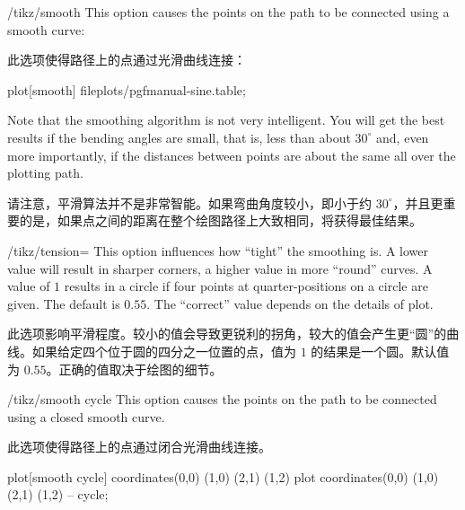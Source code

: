 \begin{key}{/tikz/smooth}
    This option causes the points on the path to be connected using a smooth
    curve:

    此选项使得路径上的点通过光滑曲线连接：

    \begin{codeexample}[]
\tikz\draw plot[smooth] file{plots/pgfmanual-sine.table};
\end{codeexample}

    Note that the smoothing algorithm is not very intelligent. You will get the
    best results if the bending angles are small, that is, less than about
    $30^\circ$ and, even more importantly, if the distances between points are
    about the same all over the plotting path.

    请注意，平滑算法并不是非常智能。如果弯曲角度较小，即小于约 $30^\circ$，并且更重要的是，如果点之间的距离在整个绘图路径上大致相同，将获得最佳结果。

\end{key}

\begin{key}{/tikz/tension=}
    This option influences how ``tight'' the smoothing is. A lower value will
    result in sharper corners, a higher value in more ``round'' curves. A value
    of $1$ results in a circle if four points at quarter-positions on a circle
    are given. The default is $0.55$. The ``correct'' value depends on the
    details of plot.
    
    此选项影响平滑程度。较小的值会导致更锐利的拐角，较大的值会产生更“圆”的曲线。如果给定四个位于圆的四分之一位置的点，值为 $1$ 的结果是一个圆。默认值为 $0.55$。正确的值取决于绘图的细节。

    \begin{codeexample}[]
\end{codeexample}
\end{key}

\begin{key}{/tikz/smooth cycle}
    This option causes the points on the path to be connected using a closed
    smooth curve.
 
    此选项使得路径上的点通过闭合光滑曲线连接。

    \begin{codeexample}[]
\tikz[scale=0.5]
  \draw plot[smooth cycle] coordinates{(0,0) (1,0) (2,1) (1,2)}
        plot               coordinates{(0,0) (1,0) (2,1) (1,2)} -- cycle;
\end{codeexample}
\end{key}

